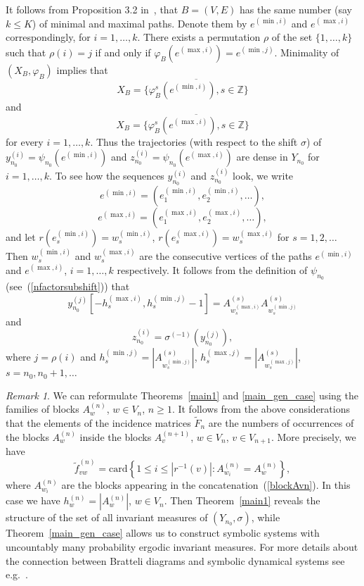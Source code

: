 \documentclass[11pt, english, reqno]{amsart}
\theoremstyle{definition}
\theoremstyle{remark}
\newtheorem{remar}[defin]{Remark}
\theoremstyle{plain}
\def\tl{\widetilde}
\numberwithin{equation}{section}
\begin{document}
{It follows from Proposition 3.2 in~\cite{BezuglyiKwiatkowskiYassawi2014},
that $B = (V,E)$ has the same number (say $k \leq K$) of minimal and
maximal paths. Denote them by $e^{(\min,i)}$ and $e^{(\max,i)}$
correspondingly, for $i = 1,\ldots, k$. There exists a permutation $\rho$ of
the set $\{1,\ldots, k\}$
such that $\rho(i) = j$ if and only if $\varphi_B(e^{(\max,i)}) = e^{(\min,j)}
$. Minimality of $(X_B, \varphi_B)$ implies that
$$
X_B = \overline{\{\varphi_B^s(e^{(\min,i)}), s \in \mathbb{Z}\}}
$$
and
$$
X_B = \overline{\{\varphi_B^s(e^{(\max,i)}), s \in \mathbb{Z}\}}
$$
for every $i = 1,\ldots,k$.
Thus the trajectories (with respect to the shift $\sigma$) of $y_{n_0}^{(i)}
= \psi_{n_0}(e^{(\min,i)})$ and $z_{n_0}^{(i)} = \psi_{n_0}(e^{(\max,i)})
$ are dense in $Y_{n_0}$ for $i = 1,\ldots,k$. To see how the sequences
$y_{n_0}^{(i)}$ and $z_{n_0}^{(i)}$ look, we write
$$
e^{(\min,i)} = (e^{(\min,i)}_1, e^{(\min,i)}_2, \ldots),
$$
$$
e^{(\max,i)} = (e^{(\max,i)}_1, e^{(\max,i)}_2, \ldots),
$$
and let $r(e^{(\min,i)}_s) = w_s^{(\min,i)}$, $r(e^{(\max,i)}_s) =
w_s^{(\max,i)}$ for $s = 1,2,\ldots$ Then $w_s^{(\min,i)}$ and
$w_s^{(\max,i)}$ are the consecutive vertices of the paths $e^{(\min,i)}$
and
$e^{(\max,i)}$, $i = 1,\ldots,k$ respectively. It follows from the definition of
$\psi_{n_0}$ (see~(\ref{nfactorsubshift})) that
$$
y_{n_0}^{(j)}\left[-h_s^{(\max,i)}, h_s^{(\min,j)} - 1\right] = A^{(s)}
_{w_s^{(\max,i)}}A^{(s)}_{w_s^{(\min,j)}}
$$
and
$$
z_{n_0}^{(i)} = \sigma^{(-1)}(y_{n_0}^{(j)}),
$$
where $j = \rho(i)$ and $h_s^{(\min,j)} = |A^{(s)}_{w_s^{(\min,j)}}|$,
$h_s^{(\max,j)} = |A^{(s)}_{w_s^{(\max,j)}}|$, $s = n_0, n_0 + 1, \ldots$


\begin{remar}
We can reformulate Theorems~\ref{main1} and \ref{main_gen_case} using
 the
families of blocks $A_w^{(n)}$, $w \in V_n$, $n \geq 1$. It follows from the
above considerations that the elements of the incidence matrices $\tl F_n$
are the numbers of occurrences of the blocks $A_w^{(n)}$ inside the blocks
$A_v^{(n+1)}$, $w \in V_n$, $v \in V_{n+1}$. More precisely, we have
$$
\tl f_{vw}^{(n)} = \mathrm{card}\left \{1 \leq i \leq |r^{-1}(v)|: A_{w_i}
^{(n)} = A_w^{(n)}\right\},
$$
where $A_{w_i}^{(n)}$ are the blocks appearing in the
concatenation~(\ref{blockAvn}). In this case we have $h_w^{(n)} = |
A_w^{(n)}|$, $w \in V_n$. Then Theorem~\ref{main1} reveals the structure
of the set of all invariant measures of $(Y_{n_0}, \sigma)$, while Theorem~\ref{main_gen_case} allows us to construct symbolic systems with
 uncountably many probability ergodic invariant measures. For more details about the connection between Bratteli diagrams and symbolic dynamical systems see e.g.~\cite{DurandHostSkau1999, BezuglyiKwiatkowskiMedynets2009, Durand2010, DownarowiczMaass2008, BezuglyiKarpel2014, DownarowiczKarpel2018, DownarowiczKarpel}.
\end{remar}

}
\end{document}
